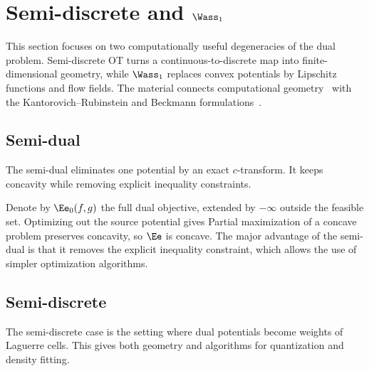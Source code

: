 
\section[Semi-discrete and W1]{Semi-discrete and $\Wass_1$}
\label{sec-semidiscr-w1}

This section focuses on two computationally useful degeneracies of the dual problem. Semi-discrete OT turns a continuous-to-discrete map into finite-dimensional geometry, while $\Wass_1$ replaces convex potentials by Lipschitz functions and flow fields. The material connects computational geometry~\cite{AurenhammerHA98,Merigot11,merigot2013comparison} with the Kantorovich--Rubinstein and Beckmann formulations~\cite{kantorovich1958space,Beckmann52}.

\subsection{Semi-dual}

The semi-dual eliminates one potential by an exact $c$-transform. It keeps concavity while removing explicit inequality constraints.

Denote by $\Ee_0(f,g)$ the full dual objective, extended by $-\infty$ outside the feasible set. Optimizing out the source potential gives
Partial maximization of a concave problem preserves concavity, so $\Ee$ is concave. The major advantage of the semi-dual is that it removes the explicit inequality constraint, which allows the use of simpler optimization algorithms.


\subsection{Semi-discrete}


The semi-discrete case is the setting where dual potentials become weights of Laguerre cells. This gives both geometry and algorithms for quantization and density fitting.

